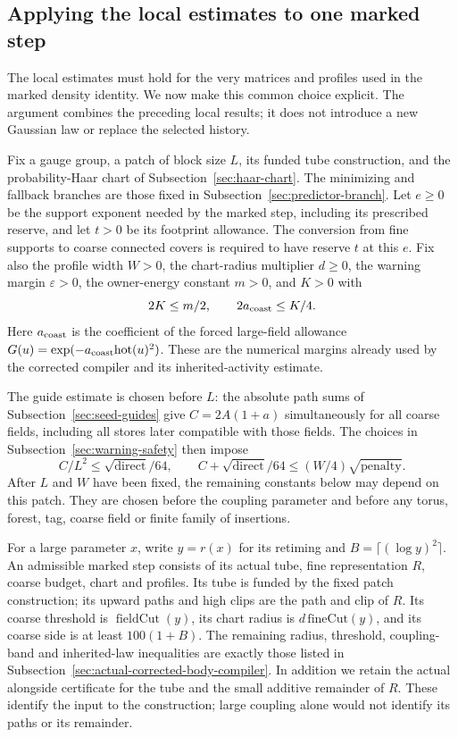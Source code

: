\subsection{Applying the local estimates to one marked step}
\label{sec:actual-local-compiler-handoff}

The local estimates must hold for the very matrices and profiles used in
the marked density identity. We now make this common choice explicit.
The argument combines the preceding local results; it does not introduce
a new Gaussian law or replace the selected history.

Fix a gauge group, a patch of block size $L$, its funded tube construction,
and the probability-Haar chart of Subsection~\ref{sec:haar-chart}. The
minimizing and fallback branches are those fixed in
Subsection~\ref{sec:predictor-branch}. Let $e\geq0$ be the support exponent
needed by the marked step, including its prescribed reserve, and let
$t>0$ be its footprint allowance. The conversion from fine supports to
coarse connected covers is required to have reserve $t$ at this $e$.
Fix also the profile width $W>0$, the chart-radius multiplier $d\geq0$,
the warning margin $\varepsilon>0$, the owner-energy constant $m>0$,
and $K>0$ with
\[
 2K\leq m/2,\qquad 2a_{\rm coast}\leq K/4.
\]
Here $a_{\rm coast}$ is the coefficient of the forced large-field
allowance $G(u)=\exp(-a_{\rm coast}\mathrm{hot}(u)^2)$. These are the numerical margins already used by the corrected
compiler and its inherited-activity estimate.

The guide estimate is chosen before $L$: the absolute path sums of
Subsection~\ref{sec:seed-guides} give $C=2A(1+a)$ simultaneously for all
coarse fields, including all stores later compatible with those fields.
The choices in Subsection~\ref{sec:warning-safety} then impose
\[
 C/L^2\leq\sqrt{\mathrm{direct}}/64,
 \qquad C+\sqrt{\mathrm{direct}}/64
              \leq (W/4)\sqrt{\mathrm{penalty}}.
\]
After $L$ and $W$ have been fixed, the remaining constants below may depend
on this patch. They are chosen before the coupling parameter and before
any torus, forest, tag, coarse field or finite family of insertions.

For a large parameter $x$, write $y=r(x)$ for its retiming and
$B=\lceil(\log y)^2\rceil$. An admissible marked step consists of its
actual tube, fine representation $R$, coarse budget, chart and profiles.
Its tube is funded by the fixed patch construction; its upward paths and
high clips are the path and clip of $R$. Its coarse threshold is
$\operatorname{fieldCut}(y)$, its chart radius is $d\,\mathrm{fineCut}(y)$,
and its coarse side is at least $100(1+B)$. The remaining radius,
threshold, coupling-band and inherited-law inequalities are exactly those
listed in Subsection~\ref{sec:actual-corrected-body-compiler}. In addition we
retain the actual alongside certificate for the tube and the small
additive remainder of $R$. These identify the input to the construction;
large coupling alone would not identify its paths or its remainder.

